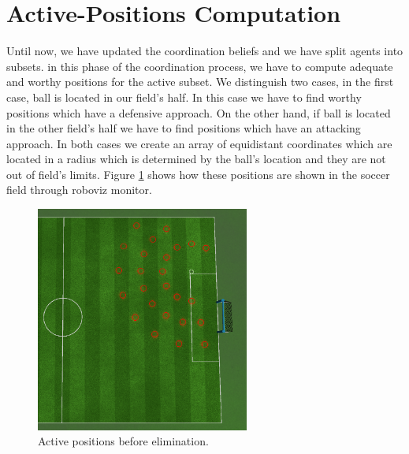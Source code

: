 \section{Active-Positions Computation}
Until now, we have updated the coordination beliefs and we have split agents into subsets. in this phase of the coordination process, we have to compute adequate and worthy positions for the active subset. We distinguish two cases, in the first case, ball is located in our field's half. In this case we have to find worthy positions which have a defensive approach. On the other hand, if ball is located in the other field's half we have to find positions which have an attacking approach. In both cases we create an array of equidistant coordinates which are located in a radius which is determined by the ball's location and they are not out of field's limits. Figure \ref{fig:ActivePositions2} shows how these positions are shown in the soccer field through roboviz monitor. 
\begin{figure}[htb!]
\centering
  \includegraphics[width=7cm]{Chapter4/figures/ActivePositions2.png}
  \caption{Active positions before elimination.} 
  \label{fig:ActivePositions2}
\end{figure}

